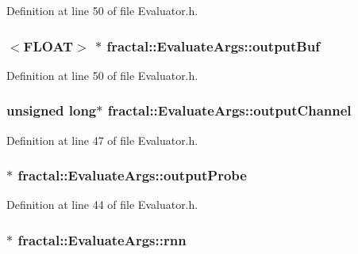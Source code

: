 Definition at line 50 of file Evaluator.\+h.

\hypertarget{classfractal_1_1EvaluateArgs_a865c5f2cd3bdea63ce35ff7be47efae0}{
\subsubsection[{output\+Buf}]{$<${\bf F\+L\+O\+A\+T}$>$ $\ast$ fractal\+::\+Evaluate\+Args\+::output\+Buf}}\label{classfractal_1_1EvaluateArgs_a865c5f2cd3bdea63ce35ff7be47efae0}


Definition at line 50 of file Evaluator.\+h.

\hypertarget{classfractal_1_1EvaluateArgs_a5ab52cd8a035d8a83c0067a52c3fbb48}{
\subsubsection[{output\+Channel}]{\setlength{\rightskip}{0pt plus 5cm}unsigned long$\ast$ fractal\+::\+Evaluate\+Args\+::output\+Channel}}\label{classfractal_1_1EvaluateArgs_a5ab52cd8a035d8a83c0067a52c3fbb48}


Definition at line 47 of file Evaluator.\+h.

\hypertarget{classfractal_1_1EvaluateArgs_a40445d2ce74fd96775037b13046ec349}{
\subsubsection[{output\+Probe}]{$\ast$ fractal\+::\+Evaluate\+Args\+::output\+Probe}}\label{classfractal_1_1EvaluateArgs_a40445d2ce74fd96775037b13046ec349}


Definition at line 44 of file Evaluator.\+h.

\hypertarget{classfractal_1_1EvaluateArgs_aaf7bd34d480385ed5d821673f60f41d5}{
\subsubsection[{rnn}]{$\ast$ fractal\+::\+Evaluate\+Args\+::rnn}}\label{classfractal_1_1EvaluateArgs_aaf7bd34d480385ed5d821673f60f41d5}


